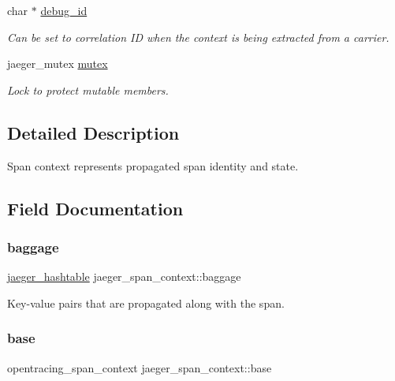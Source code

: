 \begin{DoxyCompactItemize}
char $\ast$ \mbox{\hyperlink{structjaeger__span__context_ac20ee048f523b07af732d686797fed17}{debug\+\_\+id}}
\begin{DoxyCompactList}\small\item\em Can be set to correlation ID when the context is being extracted from a carrier. \end{DoxyCompactList}\item 
jaeger\+\_\+mutex \mbox{\hyperlink{structjaeger__span__context_a56712a12a4461df451f26c91cad7a3e9}{mutex}}
\begin{DoxyCompactList}\small\item\em Lock to protect mutable members. \end{DoxyCompactList}\end{DoxyCompactItemize}


\subsection{Detailed Description}
Span context represents propagated span identity and state. 

\subsection{Field Documentation}
\mbox{\label{structjaeger__span__context_aedfb64b810e041a807dd6e0ea8274215}} 
\subsubsection{\texorpdfstring{baggage}{baggage}}
{\footnotesize\ttfamily \mbox{\hyperlink{structjaeger__hashtable}{jaeger\+\_\+hashtable}} jaeger\+\_\+span\+\_\+context\+::baggage}



Key-\/value pairs that are propagated along with the span. 

\mbox{\label{structjaeger__span__context_a306504cd5d3064edc49c70e8d485a067}} 
\subsubsection{\texorpdfstring{base}{base}}
{\footnotesize\ttfamily opentracing\+\_\+span\+\_\+context jaeger\+\_\+span\+\_\+context\+::base}




